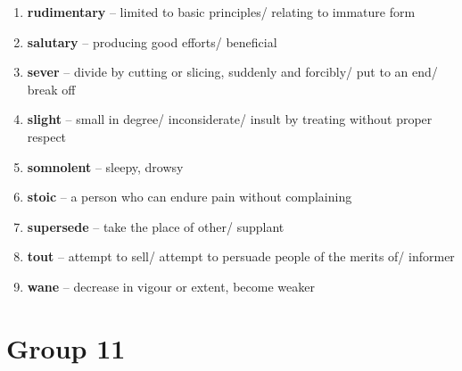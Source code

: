 \begin{enumerate}[wide,labelindent=0pt]
\item \textbf{rudimentary} -- limited to basic principles/ relating to immature form
\item \textbf{salutary} -- producing good efforts/ beneficial
\item \textbf{sever} -- divide by cutting or slicing, suddenly and forcibly/ put to an end/ break off
\item \textbf{slight} -- small in degree/ inconsiderate/ insult by treating without proper respect
\item \textbf{somnolent} -- sleepy, drowsy
\item \textbf{stoic} -- a person who can endure pain without complaining
\item \textbf{supersede} -- take the place of other/ supplant
\item \textbf{tout} -- attempt to sell/ attempt to persuade people of the merits of/ informer
\item \textbf{wane} -- decrease in vigour or extent, become weaker
\end{enumerate}

\newpage
\section{Group 11}

